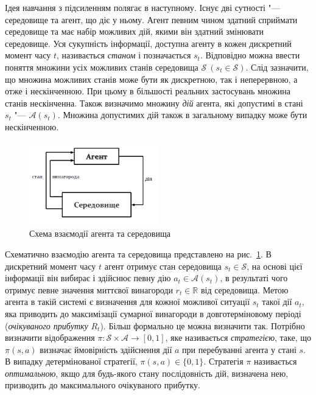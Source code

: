 \documentclass[a4paper,10pt,fleqn]{article}
\begin{document}
Ідея навчання з підсиленням полягає в наступному. Існує дві сутності "--- середовище та агент, що діє у ньому. Агент певним чином здатний сприймати середовище та має набір можливих дій, якими він здатний змінювати середовище. Уся сукупність інформації, доступна агенту в кожен дискретний момент часу $t$, називається \emph{станом} і позначається $s_t$. Відповідно можна ввести поняття множини усіх можливих станів середовища $\mathcal{S}\ (s_t \in \mathcal{S})$. Слід зазначити, що множина можливих станів може бути як дискретною, так і неперервною, а отже і нескінченною. При цьому в більшості реальних застосувань множина станів нескінченна. Також визначимо множину \emph{дій} агента, які допустимі в стані $s_t$ "--- $\mathcal{A}(s_t)$. Множина допустимих дій також в загальному випадку може бути нескінченною.

\begin{figure}
\centering
\includegraphics[width=0.5\textwidth]{agent-env-diagram.png}
\caption{Схема взаємодії агента та середовища}
\label{fig:agent-env-diagram}
\end{figure}
Схематично взаємодію агента та середовища представлено на рис.~\ref{fig:agent-env-diagram}. В дискретний момент часу $t$ агент отримує стан середовища $s_t \in \mathcal{S}$, на основі цієї інформації він вибирає і здійснює певну дію $a_t \in \mathcal{A}(s_t)$, в результаті чого отримує певне значення миттєвої винагороди $r_t \in \mathbb{R}$ від середовища. Метою агента в такій системі є визначення для кожної можливої ситуації $s_t$ такої дії $a_t$, яка приводить до максимізації сумарної винагороди в довготерміновому періоді (\emph{очікуваного прибутку} $R_t$). Більш формально це можна визначити так. Потрібно визначити відображення $\pi:\mathcal{S}\times\mathcal{A} \rightarrow [0,1]$, яке називається \emph{стратегією}, таке, що $\pi(s, a)$ визначає ймовірність здійснення дії $a$ при перебуванні агента у стані $s$. В випадку детермінованої стратегії, $\pi(s,a) \in \{0,1\}$. Стратегія $\pi$ називається \emph{оптимальною}, якщо для будь-якого стану послідовність дій, визначена нею, призводить до максимального очікуваного прибутку.
\end{document}

